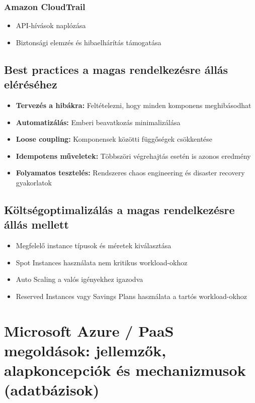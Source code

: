 \documentclass[a4paper,12pt]{article}
\begin{document}
    \subsubsection{Amazon CloudTrail}

    \begin{itemize}
        \item API-hívások naplózása
        \item Biztonsági elemzés és hibaelhárítás támogatása
    \end{itemize}

    \subsection{Best practices a magas rendelkezésre állás eléréséhez}

    \begin{itemize}
        \item \textbf{Tervezés a hibákra:} Feltételezni, hogy minden komponens meghibásodhat
        \item \textbf{Automatizálás:} Emberi beavatkozás minimalizálása
        \item \textbf{Loose coupling:} Komponensek közötti függőségek csökkentése
        \item \textbf{Idempotens műveletek:} Többszöri végrehajtás esetén is azonos eredmény
        \item \textbf{Folyamatos tesztelés:} Rendszeres chaos engineering és disaster recovery gyakorlatok
    \end{itemize}

    \subsection{Költségoptimalizálás a magas rendelkezésre állás mellett}

    \begin{itemize}
        \item Megfelelő instance típusok és méretek kiválasztása
        \item Spot Instances használata nem kritikus workload-okhoz
        \item Auto Scaling a valós igényekhez igazodva
        \item Reserved Instances vagy Savings Plans használata a tartós workload-okhoz
    \end{itemize}

    \newpage


    \section{Microsoft Azure / PaaS megoldások: jellemzők, alapkoncepciók és mechanizmusok (adatbázisok)}
\end{document}
